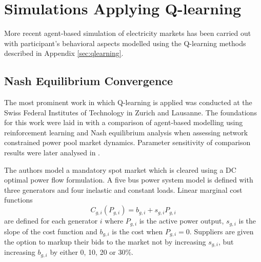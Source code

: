 \section{Simulations Applying Q-learning}
%
More recent agent-based simulation of electricity markets has been carried out
with participant's behavioral aspects modelled using the Q-learning methods
described in Appendix \ref{sec:qlearning}.

\subsection{Nash Equilibrium Convergence}
The most prominent work in which Q-learning is applied was conducted
at the Swiss Federal Institutes of Technology in Zurich and Lausanne. The
foundations for this work were laid in  with a comparison
of agent-based modelling using reinforcement learning and Nash equilibrium
analysis when assessing network constrained power pool market dynamics.
Parameter sensitivity of comparison results were later analysed in
.

The authors model a mandatory spot market which is cleared using a DC
optimal power flow formulation.  A five bus power system model is defined with
three generators and four inelastic and constant loads.  Linear marginal cost
functions
\begin{equation}
C_{g,i}(P_{g,i}) = b_{g,i} + s_{g,i}P_{g,i}
\end{equation}
are defined for each generator $i$ where $P_{g,i}$ is the active power output,
$s_{g,i}$ is the slope of the cost function and $b_{g,i}$ is the cost when
$P_{g,i} = 0$.  Suppliers are given the option to markup their bids to the
market not by increasing $s_{g,i}$, but increasing $b_{g,i}$ by either 0,
10, 20 or 30\%.

